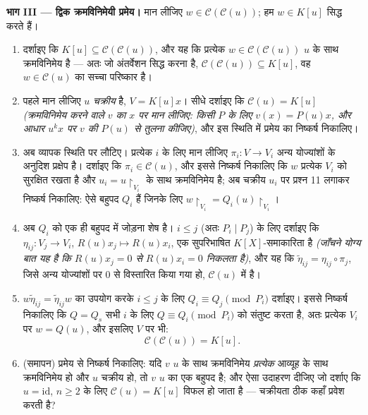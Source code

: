\begin{problem}
\medskip
\noindent\textbf{भाग III --- द्विक क्रमविनिमेयी प्रमेय।} मान
लीजिए $w \in \mathcal C(\mathcal C(u))$; हम $w \in K[u]$ सिद्ध करते हैं।
\begin{enumerate}[resume]
  \item दर्शाइए कि $K[u] \subseteq \mathcal C(\mathcal C(u))$, और यह कि प्रत्येक $w \in \mathcal C(\mathcal C(u))$ $u$ के साथ
        क्रमविनिमेय है --- अतः जो अंतर्वेशन सिद्ध करना है,
        $\mathcal C(\mathcal C(u)) \subseteq K[u]$, वह $w \in \mathcal C(u)$ का सच्चा परिष्कार है।
  \item पहले मान लीजिए $u$ \emph{चक्रीय} है, $V = K[u]x$। सीधे
        दर्शाइए कि $\mathcal C(u) = K[u]$ \emph{(क्रमविनिमेय करने वाले $v$ का
        $x$ पर मान लीजिए: किसी $P$ के लिए $v(x) = P(u)x$, और आधार
        $u^k x$ पर $v$ की $P(u)$ से तुलना कीजिए)}, और इस स्थिति
        में प्रमेय का निष्कर्ष निकालिए।
  \item अब व्यापक स्थिति पर लौटिए। प्रत्येक $i$ के लिए मान
        लीजिए $\pi_i\colon
        V \to V_i$ अन्य योज्यांशों के अनुदिश प्रक्षेप है।
        दर्शाइए कि $\pi_i \in \mathcal C(u)$, और इससे निष्कर्ष निकालिए कि $w$
        प्रत्येक $V_i$ को सुरक्षित रखता है और $u_i =
        u\restriction_{V_i}$ के साथ
        क्रमविनिमेय है; अब चक्रीय $u_i$ पर प्रश्न 11 लगाकर
        निष्कर्ष निकालिए: ऐसे बहुपद $Q_i$ हैं जिनके लिए $w\restriction_{V_i} = Q_i(u)\restriction_{V_i}$।
  \item अब $Q_i$ को एक ही बहुपद में जोड़ना शेष है। $i
        \leq j$ (अतः
        $P_i \mid P_j$) के लिए दर्शाइए कि $\eta_{ij} \colon
        V_j \to V_i$, $R(u)x_j \mapsto R(u)x_i$, एक सुपरिभाषित
        $K[X]$-समाकारिता है \emph{(जाँचने योग्य बात यह है कि
        $R(u)x_j = 0$ से $R(u)x_i = 0$ निकलता है)}, और यह कि $\tilde\eta_{ij} = \eta_{ij}\circ\pi_j$, जिसे अन्य
        योज्यांशों पर $0$ से विस्तारित किया गया हो, $\mathcal C(u)$ में
        है।
  \item $w\tilde\eta_{ij} = \tilde\eta_{ij}w$ का उपयोग करके $i \leq j$ के लिए $Q_i
        \equiv Q_j \pmod{P_i}$ दर्शाइए। इससे
        निष्कर्ष निकालिए कि $Q =
        Q_s$ सभी $i$ के लिए $Q \equiv Q_i \pmod {P_i}$ को
        संतुष्ट करता है, अतः प्रत्येक $V_i$ पर $w = Q(u)$, और इसलिए
        $V$ पर भी:
        \[
        \boxed{\ \mathcal C(\mathcal C(u)) = K[u].\ }
        \]
  \item (समापन) प्रमेय से निष्कर्ष निकालिए: यदि $v$ $u$ के
        साथ क्रमविनिमेय \emph{प्रत्येक} आव्यूह के साथ
        क्रमविनिमेय हो और $u$ चक्रीय हो, तो $v$ $u$ का एक
        बहुपद है; और ऐसा उदाहरण दीजिए जो दर्शाए कि $u =
        \mathrm{id}$, $n \geq 2$
        के लिए $\mathcal C(u) = K[u]$ विफल हो जाता है --- चक्रीयता ठीक कहाँ
        प्रवेश करती है?
\end{enumerate}


\end{problem}

